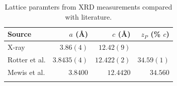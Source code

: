 \begin{table}[htbp]
    \begin{center}
        \caption{Lattice paramters from XRD measurements compared with literature.}
        \begin{tabular}{lrrr}
\toprule
Source  &  $a$ (\AA) & $c$ (\AA) & $z_P$ (\% $c$)\\
\midrule
X-ray   & $3.86(4)$  & $12.42(9)$ & \\
Rotter et al.\cite{Rotter2010} & $3.8435(4) $ & $12.422(2)$ & $34.59(1)$ \\
Mewis et al.\cite{Mewis1980} & $3.8400$ & $12.4420$ & $34.560$ \\
\bottomrule
        \label{Table:ResD:LatticeParams}
        \end{tabular}
    \end{center}
\end{table}

